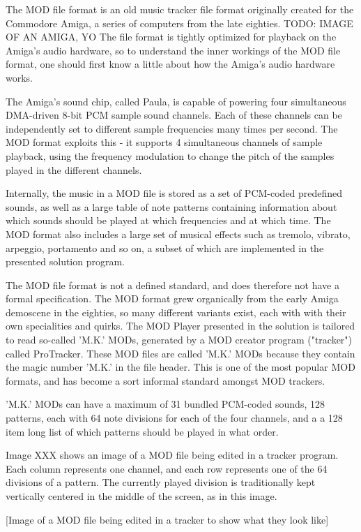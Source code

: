 
The MOD file format is an old music tracker file format originally created for the Commodore Amiga, a series of computers from the late eighties. TODO: IMAGE OF AN AMIGA, YO
The file format is tightly optimized for playback on the Amiga's audio hardware, so to understand the inner workings of the MOD file format, one should first know a little about how the Amiga's audio hardware works.

The Amiga's sound chip, called Paula, is capable of powering four simultaneous DMA-driven 8-bit PCM sample sound channels.
Each of these channels can be independently set to different sample frequencies many times per second.
The MOD format exploits this - it supports 4 simultaneous channels of sample playback, using the frequency modulation to change the pitch of the samples played in the different channels.

Internally, the music in a MOD file is stored as a set of PCM-coded predefined sounds, as well as a large table of note patterns containing information about which sounds should be played at which frequencies and at which time.
The MOD format also includes a large set of musical effects such as tremolo, vibrato, arpeggio, portamento and so on, a subset of which are implemented in the presented solution program.

The MOD file format is not a defined standard, and does therefore not have a formal specification.
The MOD format grew organically from the early Amiga demoscene in the eighties, so many different variants exist, each with with their own specialities and quirks.
The MOD Player presented in the solution is tailored to read so-called 'M.K.' MODs, generated by a MOD creator program ("tracker") called ProTracker.
These MOD files are called 'M.K.' MODs because they contain the magic number 'M.K.' in the file header.
This is one of the most popular MOD formats, and has become a sort informal standard amongst MOD trackers.

'M.K.' MODs can have a maximum of 31 bundled PCM-coded sounds, 128 patterns, each with 64 note divisions for each of the four channels, and a a 128 item long list of which patterns should be played in what order.

Image XXX shows an image of a MOD file being edited in a tracker program.
Each column represents one channel, and each row represents one of the 64 divisions of a pattern.
The currently played division is traditionally kept vertically centered in the middle of the screen, as in this image.

[Image of a MOD file being edited in a tracker to show what they look like]
